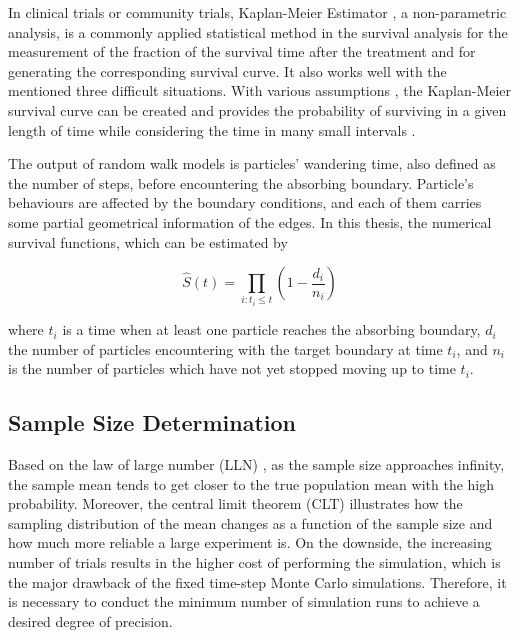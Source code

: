 In clinical trials or community trials, Kaplan-Meier Estimator
\cite{kaplan1958nonparametric}, a non-parametric analysis, is a
commonly applied statistical method in the survival analysis for the
measurement of the fraction of the survival time after the treatment
\cite{aalen2008survival} and for generating the corresponding survival
curve. It also works well with the mentioned three difficult
situations. With various assumptions \cite{etikan2017kaplan}
\cite{goel2010understanding}, the Kaplan-Meier survival curve can be
created and provides the probability of surviving in a given length of
time while considering the time in many small intervals
\cite{altman1990practical}.


The output of random walk models is particles' wandering time, also
defined as the number of steps, before encountering the absorbing
boundary. Particle's behaviours are affected by the boundary
conditions, and each of them carries some partial geometrical
information of the edges. In this thesis, the numerical survival
functions, which can be estimated by \cite{aalen2008survival}

\begin{equation}
  \widehat{S}(t) = \prod_{i:t_i \leq t} (1 - \frac{d_i}{n_i})
\end{equation}

where $t_i$ is a time when at least one particle reaches the absorbing
boundary, $d_i$ the number of particles encountering with the target
boundary at time $t_i$, and $n_i$ is the number of particles which
have not yet stopped moving up to time $t_i$.


\subsection{Sample Size Determination}

Based on the law of large number (LLN) \cite{dekking2005modern}, as
the sample size approaches infinity, the sample mean tends to get
closer to the true population mean with the high
probability. Moreover, the central limit theorem (CLT)
\cite{dekking2005modern} illustrates how the sampling distribution of
the mean changes as a function of the sample size and how much more
reliable a large experiment is. On the downside, the increasing number
of trials results in the higher cost of performing the simulation,
which is the major drawback of the fixed time-step Monte Carlo
simulations. Therefore, it is necessary to conduct the minimum number
of simulation runs to achieve a desired degree of precision.


